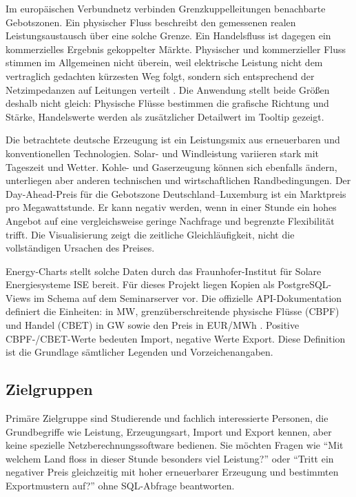 Im europäischen Verbundnetz verbinden Grenzkuppelleitungen benachbarte
Gebotszonen. Ein physischer Fluss beschreibt den gemessenen realen
Leistungsaustausch über eine solche Grenze. Ein Handelsfluss ist dagegen ein
kommerzielles Ergebnis gekoppelter Märkte. Physischer und kommerzieller Fluss
stimmen im Allgemeinen nicht überein, weil elektrische Leistung nicht dem
vertraglich gedachten kürzesten Weg folgt, sondern sich entsprechend der
Netzimpedanzen auf Leitungen verteilt \cite{smardFlows}. Die Anwendung stellt
beide Grö{\ss}en deshalb nicht gleich: Physische Flüsse bestimmen die grafische
Richtung und Stärke, Handelswerte werden als zusätzlicher Detailwert im
Tooltip gezeigt.

Die betrachtete deutsche Erzeugung ist ein Leistungsmix aus erneuerbaren und
konventionellen Technologien. Solar- und Windleistung variieren stark mit
Tageszeit und Wetter. Kohle- und Gaserzeugung können sich ebenfalls ändern,
unterliegen aber anderen technischen und wirtschaftlichen Randbedingungen.
Der Day-Ahead-Preis für die Gebotszone Deutschland--Luxemburg ist ein
Marktpreis pro Megawattstunde. Er kann negativ werden, wenn in einer Stunde ein
hohes Angebot auf eine vergleichsweise geringe Nachfrage und begrenzte
Flexibilität trifft. Die Visualisierung zeigt die zeitliche Gleichläufigkeit,
nicht die vollständigen Ursachen des Preises.

Energy-Charts stellt solche Daten durch das Fraunhofer-Institut für Solare
Energiesysteme ISE bereit. Für dieses Projekt liegen Kopien als PostgreSQL-
Views im Schema  auf dem Seminarserver vor. Die offizielle
API-Dokumentation definiert die Einheiten:  in MW,
grenzüberschreitende physische Flüsse (CBPF) und Handel (CBET) in GW sowie den
Preis in EUR/MWh \cite{energychartsOpenapi}. Positive CBPF-/CBET-Werte bedeuten
Import, negative Werte Export. Diese Definition ist die Grundlage sämtlicher
Legenden und Vorzeichenangaben.

\subsection{Zielgruppen}
\label{sec:zielgruppen}

Primäre Zielgruppe sind Studierende und fachlich interessierte Personen, die
Grundbegriffe wie Leistung, Erzeugungsart, Import und Export kennen, aber keine
spezielle Netzberechnungssoftware bedienen. Sie möchten Fragen wie
``Mit welchem Land floss in dieser Stunde besonders viel Leistung?'' oder
``Tritt ein negativer Preis gleichzeitig mit hoher erneuerbarer Erzeugung und
bestimmten Exportmustern auf?'' ohne SQL-Abfrage beantworten.

